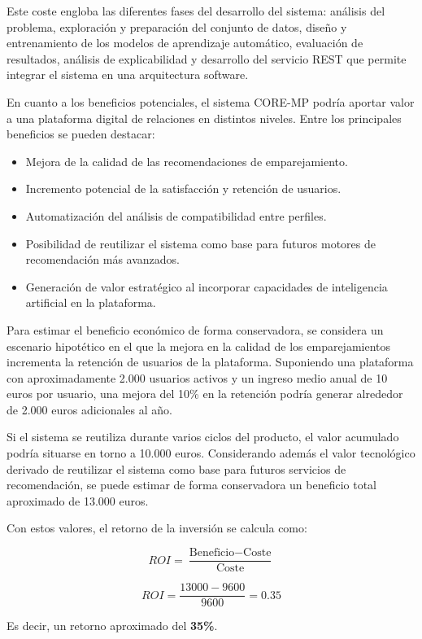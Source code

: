 Este coste engloba las diferentes fases del desarrollo del sistema: análisis del 
problema, exploración y preparación del conjunto de datos, diseño y entrenamiento 
de los modelos de aprendizaje automático, evaluación de resultados, análisis de 
explicabilidad y desarrollo del servicio REST que permite integrar el sistema en 
una arquitectura software.

En cuanto a los beneficios potenciales, el sistema CORE-MP podría aportar valor 
a una plataforma digital de relaciones en distintos niveles. Entre los principales 
beneficios se pueden destacar:

\begin{itemize}
    \item Mejora de la calidad de las recomendaciones de emparejamiento.
    \item Incremento potencial de la satisfacción y retención de usuarios.
    \item Automatización del análisis de compatibilidad entre perfiles.
    \item Posibilidad de reutilizar el sistema como base para futuros motores de 
    recomendación más avanzados.
    \item Generación de valor estratégico al incorporar capacidades de inteligencia 
    artificial en la plataforma.
\end{itemize}

Para estimar el beneficio económico de forma conservadora, se considera un 
escenario hipotético en el que la mejora en la calidad de los emparejamientos 
incrementa la retención de usuarios de la plataforma. Suponiendo una plataforma 
con aproximadamente 2.000 usuarios activos y un ingreso medio anual de 10 euros 
por usuario, una mejora del 10\% en la retención podría generar alrededor de 
2.000 euros adicionales al año. 

Si el sistema se reutiliza durante varios ciclos del producto, el valor acumulado 
podría situarse en torno a 10.000 euros. Considerando además el valor tecnológico 
derivado de reutilizar el sistema como base para futuros servicios de recomendación, 
se puede estimar de forma conservadora un beneficio total aproximado de 
13.000 euros.

Con estos valores, el retorno de la inversión se calcula como:

\[
ROI = \frac{\text{Beneficio} - \text{Coste}}{\text{Coste}}
\]

\[
ROI = \frac{13000 - 9600}{9600} = 0.35
\]

Es decir, un retorno aproximado del \textbf{35\%}.

